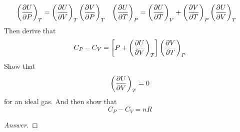 \documentclass[../psets.tex]{subfiles}
\begin{document}
\begin{enumerate}
    \begin{align*}
        \left( \pdv{U}{P} \right)_T &= \left( \pdv{U}{V} \right)_T\left( \pdv{V}{P} \right)_T&
        \left( \pdv{U}{T} \right)_P &= \left( \pdv{U}{T} \right)_V+\left( \pdv{V}{T} \right)_P\left( \pdv{U}{V} \right)_T
    \end{align*}
    Then derive that
    \begin{equation*}
        C_P-C_V = \left[ P+\left( \pdv{U}{V} \right)_T \right]\left( \pdv{V}{T} \right)_P
    \end{equation*}
    Show that
    \begin{equation*}
        \left( \pdv{U}{V} \right)_T = 0
    \end{equation*}
    for an ideal gas. And then show that
    \begin{equation*}
        C_P-C_V = nR
    \end{equation*}
    \begin{proof}[Answer]





\end{proof}
\end{enumerate}
\end{document}
